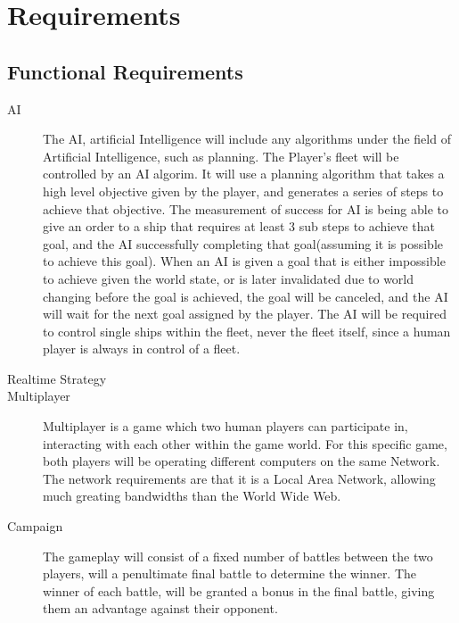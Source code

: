 \section[Requirements]{Requirements}
\label{section:requirements}



\subsection{Functional Requirements}


\begin{description}

	\item[AI] 
The AI, artificial Intelligence will include any algorithms under the field of Artificial Intelligence, such as planning.
The Player's fleet will be controlled by an AI algorim. It will use a planning algorithm that takes a high level objective given by the player, and generates a series of steps to achieve that objective.
The measurement of success for AI is being able to give an order to a ship that requires at least 3 sub steps to achieve that goal, and the AI successfully completing that goal(assuming it is possible to achieve this goal).
When an AI is given a goal that is either impossible to achieve given the world state, or is later invalidated due to world changing before the goal is achieved, the goal will be canceled, and the AI will wait for the next goal assigned by the player.
The AI will be required to control single ships within the fleet, never the fleet itself, since a human player is always in control of a fleet.

\item[Realtime Strategy]


\item[Multiplayer]
Multiplayer is a game which two human players can participate in, interacting with each other within the game world.
For this specific game, both players will be operating different computers on the same Network.
The network requirements are that it is a Local Area Network, allowing much greating bandwidths than the World Wide Web.

\item[Campaign]
The gameplay will consist of a fixed number of battles between the two players, will a penultimate final battle to determine the winner.
The winner of each battle, will be granted a bonus in the final battle, giving them an advantage against their opponent.


\end{description}
